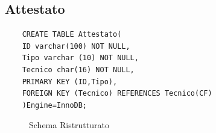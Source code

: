 \documentclass{elegantbook}
\begin{document}
\subsection{Attestato}
\begin{verbatim}
	CREATE TABLE Attestato(
	ID varchar(100) NOT NULL,
	Tipo varchar (10) NOT NULL,
	Tecnico char(16) NOT NULL,
	PRIMARY KEY (ID,Tipo),
	FOREIGN KEY (Tecnico) REFERENCES Tecnico(CF)
	)Engine=InnoDB;
\end{verbatim}
\begin{figure}[H]
	\centering
	\caption{Schema Ristrutturato}
\end{figure}
\end{document}
